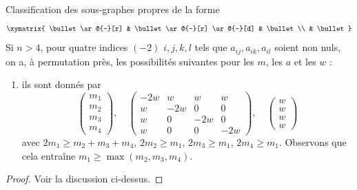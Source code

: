 \begin{lemma}
\label{lemma-D4}
Classification des sous-graphes propres de la forme
$$
\xymatrix{
\bullet \ar@{-}[r] & \bullet \ar@{-}[r] \ar@{-}[d] & \bullet \\
& \bullet
}
$$
Si $n > 4$, pour quatre indices $(-2)$ $i, j, k, l$
tels que $a_{ij}, a_{ik}, a_{il}$ soient non nuls, on a,
à permutation près, les possibilités suivantes pour les $m$, les $a$ et les $w$ :
\begin{enumerate}
\item
\label{item-D4}
ils sont donnés par
$$
\left(
\begin{matrix}
m_1 \\
m_2 \\
m_3 \\
m_4
\end{matrix}
\right),
\quad
\left(
\begin{matrix}
-2w & w & w & w \\
w & -2w & 0 & 0 \\
w & 0 & -2w & 0 \\
w & 0 & 0 & -2w 
\end{matrix}
\right),
\quad
\left(
\begin{matrix}
w \\
w \\
w \\
w
\end{matrix}
\right)
$$
avec $2m_1 \geq m_2 + m_3 + m_4$, $2m_2 \geq m_1$, $2m_3 \geq m_1$,
$2m_4 \geq m_1$. Observons que cela entraîne $m_1 \geq \max(m_2, m_3, m_4)$.
\end{enumerate}
\end{lemma}

\begin{proof}
Voir la discussion ci-dessus.
\end{proof}

